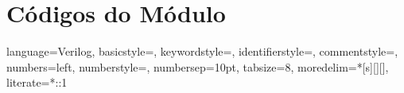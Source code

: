 \chapter{Códigos do Módulo}
\label{Apx:A}

{
	language=Verilog,
	basicstyle=\small\ttfamily,
	keywordstyle=\color{vblue},
	identifierstyle=\color{black},
	commentstyle=\color{vgreen},
	numbers=left,
	numberstyle=\tiny\color{black},
	numbersep=10pt,
	tabsize=8,
	moredelim=*[s][]{[}{]},
	literate=*{:}{:}1	
}

\makeatletter
\newcommand*\@lbracket{[}
\newcommand*\@rbracket{]}
\newcommand*\@colon{:}
\newcommand*\colorIndex{%
	\edef\@temp{\the\lst@token}%
	\ifx\@temp\@lbracket \color{black}%
	\else\ifx\@temp\@rbracket \color{black}%
	\else\ifx\@temp\@colon \color{black}%
	\else \color{vorange}%
	\fi\fi\fi
}
\makeatother

